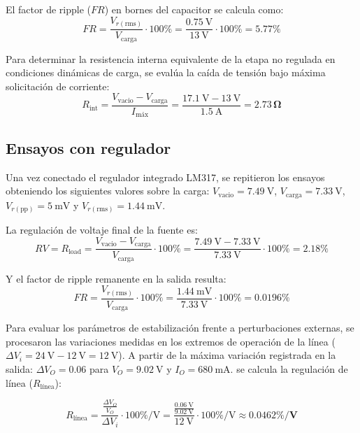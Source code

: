 \documentclass[12pt,a4paper]{article}
\begin{document}
El factor de ripple ($FR$) en bornes del capacitor se calcula como:
\begin{equation}
    FR = \frac{V_{r(\text{rms})}}{V_{\text{carga}}} \cdot 100\% = \frac{\SI{0.75}{\V}}{\SI{13}{\V}} \cdot 100\% = \mathbf{5.77\%}
\end{equation}

Para determinar la resistencia interna equivalente de la etapa no regulada en condiciones dinámicas de carga, se evalúa la caída de tensión bajo máxima solicitación de corriente:
\begin{equation}
    R_{\text{int}} = \frac{V_{\text{vacio}} - V_{\text{carga}}}{I_{\text{máx}}} = \frac{\SI{17.1}{\V} - \SI{13}{\V}}{\SI{1.5}{\A}} = \mathbf{2.73\,\Omega}
\end{equation}

\subsection{Ensayos con regulador}
Una vez conectado el regulador integrado LM317, se repitieron los ensayos obteniendo los siguientes valores sobre la carga: $V_{\text{vacio}} = \SI{7.49}{\V}$, $V_{\text{carga}} = \SI{7.33}{\V}$, $V_{r(\text{pp})} = \SI{5}{\mV}$ y $V_{r(\text{rms})} = \SI{1.44}{\mV}$. 

La regulación de voltaje final de la fuente es:
\begin{equation}
    RV = R_{\text{load}} = \frac{V_{\text{vacio}} - V_{\text{carga}}}{V_{\text{carga}}} \cdot 100\% = \frac{\SI{7.49}{\V} - \SI{7.33}{\V}}{\SI{7.33}{\V}} \cdot 100\% = \mathbf{2.18\%}
\end{equation}

Y el factor de ripple remanente en la salida resulta:
\begin{equation}
    FR = \frac{V_{r(\text{rms})}}{V_{\text{carga}}} \cdot 100\% = \frac{\SI{1.44}{\mV}}{\SI{7.33}{\V}} \cdot 100\% = \mathbf{0.0196\%}
\end{equation}

Para evaluar los parámetros de estabilización frente a perturbaciones externas, se procesaron las variaciones medidas en
los extremos de operación de la línea ($\Delta V_i = \SI{24}{\V} - \SI{12}{\V} = \SI{12}{\V}$).
A partir de la máxima variación registrada en la salida: $\Delta V_O = 0.06$ para $V_O = \SI{9.02}{\V}$ y $I_O = \SI{680}{\mA} $.
se calcula la regulación de línea ($R_{\text{línea}}$):

\begin{equation}
    R_{\text{línea}} = \frac{\frac{\Delta V_O}{V_O}}{\Delta V_i} \cdot 100\%/\text{V} = \frac{\frac{\SI{0.06}{\V}}{\SI{9.02}{\V}}}{\SI{12}{\V}} \cdot 100\%/\text{V} \approx \mathbf{0.0462\%/\text{V}}
\end{equation}
\end{document}
